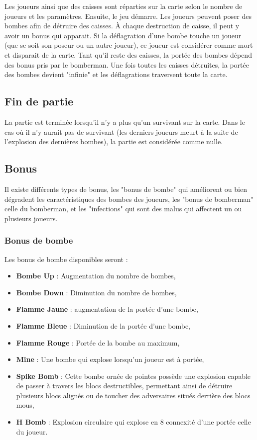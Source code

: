 Les joueurs ainsi que des caisses sont réparties sur la carte selon le nombre de joueurs et les paramètres. Ensuite, le jeu démarre. Les joueurs peuvent poser des bombes afin de détruire des caisses. À chaque destruction de caisse, il peut y avoir un bonus qui apparait. Si la déflagration d'une bombe touche un joueur (que se soit son poseur ou un autre joueur), ce joueur est considérer comme mort et disparait de la carte. Tant qu'il reste des caisses, la portée des bombes dépend des bonus pris par le bomberman. Une fois toutes les caisses détruites, la portée des bombes devient "infinie" et les déflagrations traversent toute la carte.

\subsection{Fin de partie}

La partie est terminée lorsqu'il n'y a plus qu'un survivant sur la carte. Dans le cas où il n'y aurait pas de survivant (les derniers joueurs meurt à la suite de l'explosion des dernières bombes), la partie est considérée comme nulle.

\subsection{Bonus}

Il existe différents types de bonus, les "bonus de bombe" qui améliorent ou bien dégradent les caractéristiques des bombes des joueurs, les "bonus de bomberman" celle du bomberman, et les "infections" qui sont des malus qui affectent un ou plusieurs joueurs.

\subsubsection{Bonus de bombe}

Les bonus de bombe disponibles seront :
\begin{itemize}
\item \textbf{Bombe Up} : Augmentation du nombre de bombes,
\item \textbf{Bombe Down} : Diminution du nombre de bombes,
\item \textbf{Flamme Jaune} : augmentation de la portée d'une bombe,
\item \textbf{Flamme Bleue} : Diminution de la portée d'une bombe,
\item \textbf{Flamme Rouge} : Portée de la bombe au maximum,
\item \textbf{Mine} : Une bombe qui explose lorsqu'un joueur est à portée,
\item \textbf{Spike Bomb} : Cette bombe ornée de pointes possède une explosion capable de passer à travers les blocs destructibles, permettant ainsi de détruire plusieurs blocs alignés ou de toucher des adversaires situés derrière des blocs mous,
\item \textbf{H Bomb} : Explosion circulaire qui explose en 8 connexité d'une portée celle du joueur.
\end{itemize}

